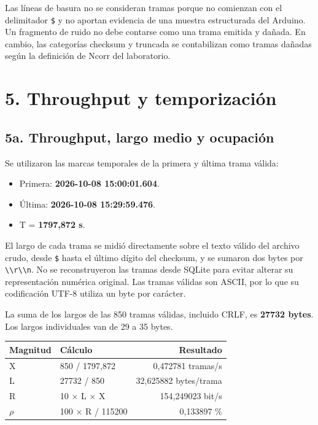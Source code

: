 \documentclass[
  11pt,
]{article}
\newcommand{\passthrough}[1]{#1}
\providecommand{\tightlist}{%
  \setlength{\itemsep}{0pt}\setlength{\parskip}{0pt}}
\begin{document}
Las líneas de basura no se consideran tramas porque no comienzan con el
delimitador \passthrough{\lstinline!$!} y no aportan evidencia de una
muestra estructurada del Arduino. Un fragmento de ruido no debe contarse
como una trama emitida y dañada. En cambio, las categorías checksum y
truncada se contabilizan como tramas dañadas según la definición de
Ncorr del laboratorio.

\hypertarget{throughput-y-temporizaciuxf3n}{%
\section{5. Throughput y
temporización}\label{throughput-y-temporizaciuxf3n}}

\hypertarget{a.-throughput-largo-medio-y-ocupaciuxf3n}{%
\subsection{5a. Throughput, largo medio y
ocupación}\label{a.-throughput-largo-medio-y-ocupaciuxf3n}}

Se utilizaron las marcas temporales de la primera y última trama válida:

\begin{itemize}
\tightlist
\item
  Primera: \textbf{2026-10-08 15:00:01.604}.
\item
  Última: \textbf{2026-10-08 15:29:59.476}.
\item
  T = \textbf{1797,872 s}.
\end{itemize}

El largo de cada trama se midió directamente sobre el texto válido del
archivo crudo, desde \passthrough{\lstinline!$!} hasta el último dígito
del checksum, y se sumaron dos bytes por
\passthrough{\lstinline!\\r\\n!}. No se reconstruyeron las tramas desde
SQLite para evitar alterar su representación numérica original. Las
tramas válidas son ASCII, por lo que su codificación UTF-8 utiliza un
byte por carácter.

La suma de los largos de las 850 tramas válidas, incluido CRLF, es
\textbf{27732 bytes}. Los largos individuales van de 29 a 35 bytes.

\Needspace{4.5cm}
\begin{longtable}[]{@{}llr@{}}
\toprule\noalign{}
Magnitud & Cálculo & Resultado \\
\midrule\noalign{}
\endhead
\bottomrule\noalign{}
\endlastfoot
X & 850 / 1797,872 & 0,472781 tramas/s \\
L & 27732 / 850 & 32,625882 bytes/trama \\
R & 10 × L × X & 154,249023 bit/s \\
\ensuremath{\rho} & 100 × R / 115200 & 0,133897 \% \\
\end{longtable}
\end{document}
